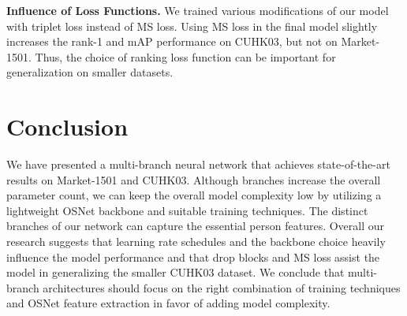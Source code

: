 \documentclass{article}
\newcommand{\nparagraph}[1]{\noindent\textbf{#1.  }}
\begin{document}
\nparagraph{Influence of Loss Functions} We trained various modifications of our model with triplet loss instead of MS loss. Using MS loss in the final model slightly increases the rank-1 and mAP performance on CUHK03, but not on Market-1501. Thus, the choice of ranking loss function can be important for generalization on smaller datasets.

\section{Conclusion}
\label{sec:conclusion}
We have presented a multi-branch neural network that achieves state-of-the-art results on Market-1501 and CUHK03. Although branches increase the overall parameter count, we can keep the overall model complexity low by utilizing a lightweight OSNet backbone and suitable training techniques. The distinct branches of our network can capture the essential person features. Overall our research suggests that learning rate schedules and the backbone choice heavily influence the model performance and that drop blocks and MS loss assist the model in generalizing the smaller CUHK03 dataset. We conclude that multi-branch architectures should focus on the right combination of training techniques and OSNet feature extraction in favor of adding model complexity.




\end{document}
